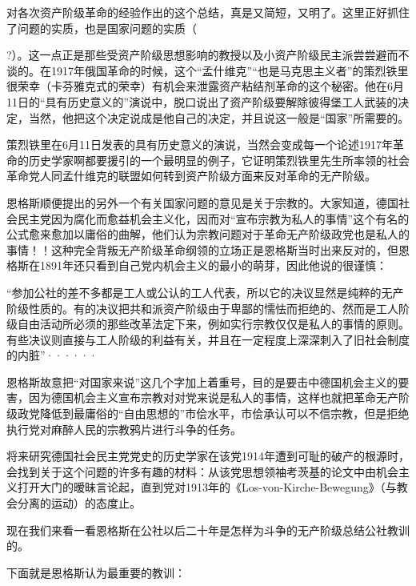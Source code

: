 对各次资产阶级革命的经验作出的这个总结，真是又简短，又明了。这里正好抓住了问题的实质，也是国家问题的实质（{?）。这一点正是那些受资产阶级思想影响的教授以及小资产阶级民主派尝尝避而不谈的。在1917年俄国革命的时候，这个“孟什维克”“也是马克思主义者”的策烈铁里很荣幸（卡芬雅克式的荣幸）有机会来泄露资产粘结剂革命的这个秘密。他在6月11日的“具有历史意义的”演说中，脱口说出了资产阶级要解除彼得堡工人武装的决定，当然，他把这个决定说成是他自己的决定，并且说这一般是“国家”所需要的。
	
策烈铁里在6月11日发表的具有历史意义的演说，当然会变成每一个论述1917年革命的历史学家啊都要援引的一个最明显的例子，它证明策烈铁里先生所率领的社会革命党人同孟什维克的联盟如何转到资产阶级方面来{\kaishu 反对}革命的无产阶级。

恩格斯顺便提出的另外一个有关国家问题的意见是关于宗教的。大家知道，德国社会民主党因为腐化而愈益机会主义化，因而对“宣布宗教为私人的事情”这个有名的公式愈来愈加以庸俗的曲解，他们认为宗教问题{\kaishu 对于}革命无产阶级{\kaishu 政党}也是私人的事情！！这种完全背叛无产阶级革命纲领的立场正是恩格斯当时出来反对的，但恩格斯在1891年还只看到自己党内机会主义的{\kaishu 最小的}萌芽，因此他说的很谨慎：

\pskip
\small
\leftskip=10mm

“参加公社的差不多都是工人或公认的工人代表，所以它的决议显然是纯粹的无产阶级性质的。有的决议把共和派资产阶级由于卑鄙的懦怯而拒绝的、然而是工人阶级自由活动所必须的那些改革法定下来，例如实行宗教仅仅是私人的事情的原则。有些决议则直接与工人阶级的利益有关，并且在一定程度上深深刺入了旧社会制度的内脏”······

\leftskip=0mm
\normalsize
\pskip

恩格斯故意把“对国家来说”这几个字加上着重号，目的是要击中德国机会主义的要害，因为德国机会主义宣布宗教对{\kaishu 对党来说}是私人的事情，这样也就把革命无产阶级政党降低到最庸俗的“自由思想的”市侩水平，市侩承认可以不信宗教，但是拒绝执行党对麻醉人民的宗教鸦片进行斗争的任务。

将来研究德国社会民主党党史的历史学家在该党1914年遭到可耻的破产的根源时，会找到关于这个问题的许多有趣的材料：从该党思想领袖考茨基的论文中由机会主义打开大门的暧昧言论起，直到党对1913年的《Los-von-Kirche-Bewegung》（与教会分离的运动）的态度止。

现在我们来看一看恩格斯在公社以后二十年是怎样为斗争的无产阶级总结公社教训的。

下面就是恩格斯认为最重要的教训：

\pskip
\small
\leftskip=10mm

}
